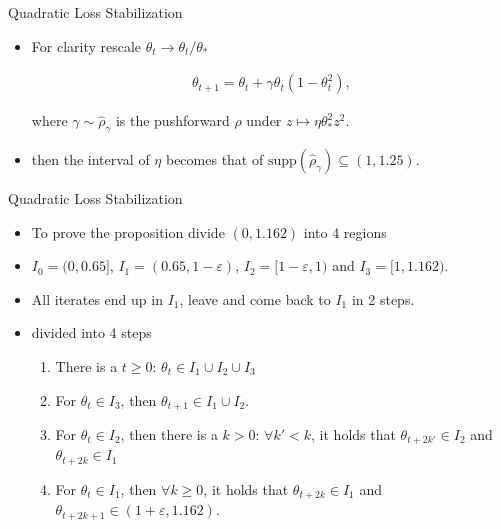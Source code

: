 \documentclass[fleqn]{beamer}
\begin{document}
    \begin{frame}{Quadratic Loss Stabilization}
        \begin{itemize}[<+->]
            \item For clarity rescale $\theta_t \to \theta_t/\theta_*$
            \begin{center}
            \begin{minipage}{0.5\textwidth}
                \begin{align*}
                    \theta_{t+1} = \theta_t + \gamma\theta_t\left(
                    1-\theta_t^{2} \right),
                \end{align*}
            \end{minipage}
            \end{center}
            where $\gamma \sim \hat{\rho}_{\gamma}$ is the pushforward
            $\hat{\rho}$ under $z \mapsto \eta\theta_*^{2}z^2$.

        \item then the interval of $\eta$ becomes that of
            $\text{supp}(\hat{\rho}_{\gamma}) \subseteq (1, 1.25)$.
        \end{itemize}
    \end{frame}

    \begin{frame}{Quadratic Loss Stabilization}
        \begin{itemize}[<+->]
            \item To prove the proposition divide $(0, 1.162)$ into 4
                regions
            \item $I_0=(0, 0.65]$, $I_1=(0.65, 1-\varepsilon)$,
                $I_2=[1-\varepsilon, 1)$ and $I_3 = [1, 1.162)$.

            \item All iterates end up in $I_1$, leave and come back to $I_1$
                in 2 steps.

            \item divided into 4 steps
                \begin{enumerate}
                    \item There is a $t\ge 0$: $\theta_t \in I_1\cup
                        I_2\cup I_3$
                    \item For $\theta_t \in I_3$, then $\theta_{t+1} \in I_1
                        \cup I_2$.
                    \item For $\theta_t \in I_2$, then there is a $k>0$:
                    $\forall k' < k$, it holds that $\theta_{t+2k'} \in
                        I_2$ and $\theta_{t+2k} \in I_1$
                    \item For $\theta_t \in I_1$, then $\forall k \ge 0$, it
                        holds that
                        $\theta_{t+2k} \in I_1$ and $\theta_{t+2k+1} \in
                        (1+\varepsilon, 1.162)$.
                \end{enumerate}


        \end{itemize}
    \end{frame}
\end{document}
